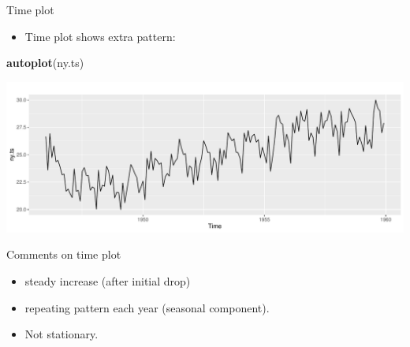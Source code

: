 \documentclass[
  ignorenonframetext,
]{beamer}
\newenvironment{Shaded}{\begin{snugshade}}{\end{snugshade}}
\newcommand{\KeywordTok}[1]{\textcolor[rgb]{0.13,0.29,0.53}{\textbf{#1}}}
\newcommand{\NormalTok}[1]{#1}
\providecommand{\tightlist}{%
  \setlength{\itemsep}{0pt}\setlength{\parskip}{0pt}}
\begin{document}
\begin{frame}[fragile]{Time plot}
\protect\hypertarget{time-plot}{}

\begin{itemize}
\tightlist
\item
  Time plot shows extra pattern:
\end{itemize}

\begin{Shaded}
\begin{Highlighting}[]
\KeywordTok{autoplot}\NormalTok{(ny.ts)}
\end{Highlighting}
\end{Shaded}

\includegraphics{slides_d29_files/figure-beamer/unnamed-chunk-527-1.pdf}

\end{frame}

\begin{frame}{Comments on time plot}
\protect\hypertarget{comments-on-time-plot}{}

\begin{itemize}
\tightlist
\item
  steady increase (after initial drop)
\item
  repeating pattern each year (seasonal component).
\item
  Not stationary.
\end{itemize}

\end{frame}
\end{document}
